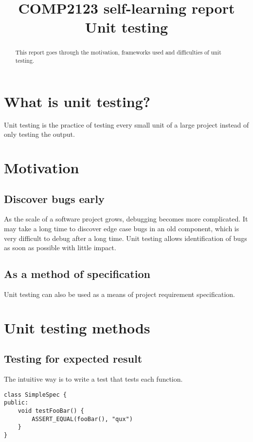 \documentclass{article}
\title{COMP2123 self-learning report \\
Unit testing}
\begin{document}

\maketitle
\begin{abstract}
	This report goes through the motivation, frameworks used and difficulties of unit testing.
\end{abstract}
\newpage

{\hypersetup{hidelinks}
	\tableofcontents
}
\newpage

\section{What is unit testing?}
Unit testing is the practice of testing every small unit of a large project instead of only testing the output.

\section{Motivation}
\subsection{Discover bugs early}
As the scale of a software project grows, debugging becomes more complicated.
It may take a long time to discover edge case bugs in an old component, which is very difficult to debug after a long time.
Unit testing allows identification of bugs as soon as possible with little impact.

\subsection{As a method of specification}
Unit testing can also be used as a means of project requirement specification.

\section{Unit testing methods}
\subsection{Testing for expected result}
The intuitive way is to write a test that tests each function.

\begin{lstlisting}[style=CppStyle]
class SimpleSpec {
public:
	void testFooBar() {
		ASSERT_EQUAL(fooBar(), "qux")
	}
}
\end{lstlisting}
\end{document}
